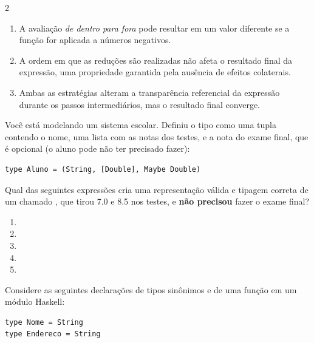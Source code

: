 \documentclass[a4paper,10pt,brazil]{article}
\begin{document}
\begin{multicols}{2}
\begin{enumerate}
  \item A avaliação \emph{de dentro para fora} pode resultar em um valor diferente se a função  for aplicada a números negativos.

  \item A ordem em que as reduções são realizadas não afeta o resultado final da expressão, uma propriedade garantida pela ausência de efeitos colaterais.

  \item Ambas as estratégias alteram a transparência referencial da expressão durante os passos intermediários, mas o resultado final converge.


\end{enumerate}

Você está modelando um sistema escolar. Definiu o tipo  como uma tupla contendo o nome, uma lista com as notas dos testes, e a nota do exame final, que é opcional (o aluno pode não ter precisado fazer):
\begin{verbatim}
type Aluno = (String, [Double], Maybe Double)
\end{verbatim}

Qual das seguintes expressões cria uma representação válida e tipagem correta de um  chamado , que tirou 7.0 e 8.5 nos testes, e \textbf{não precisou} fazer o exame final?

\begin{enumerate}
  \item {}

  \item {}

  \item {}

  \item {}

  \item {}


\end{enumerate}

Considere as seguintes declarações de tipos sinônimos e de uma função em um módulo Haskell:

\begin{verbatim}
type Nome = String
type Endereco = String


\end{verbatim}
\end{multicols}
\end{document}
